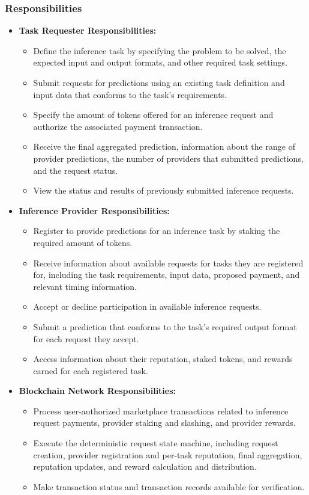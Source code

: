 \documentclass[12pt]{article}
\begin{document}
\subsubsection{Responsibilities}
\begin{itemize}

\item \textbf{Task Requester Responsibilities:}
\begin{itemize}
    \item Define the inference task by specifying the problem to be solved, the expected input and output formats, and other required task settings.
    \item Submit requests for predictions using an existing task definition and input data that conforms to the task's requirements.
    \item Specify the amount of tokens offered for an inference request and authorize the associated payment transaction.
    \item Receive the final aggregated prediction, information about the range of provider predictions, the number of providers that submitted predictions, and the request status.
    \item View the status and results of previously submitted inference requests.
\end{itemize}

\item \textbf{Inference Provider Responsibilities:}
\begin{itemize}
    \item Register to provide predictions for an inference task by staking the required amount of tokens.
    \item Receive information about available requests for tasks they are registered for, including the task requirements, input data, proposed payment, and relevant timing information.
    \item Accept or decline participation in available inference requests.
    \item Submit a prediction that conforms to the task's required output format for each request they accept.
    \item Access information about their reputation, staked tokens, and rewards earned for each registered task.
\end{itemize}

\item \textbf{Blockchain Network Responsibilities:}
\begin{itemize}
    \item Process user-authorized marketplace transactions related to inference request
    payments, provider staking and slashing, and provider rewards. 
    \item Execute the deterministic request state machine, including request
    creation, provider registration and per-task reputation, final
    aggregation, reputation updates, and reward calculation and distribution.
    \item Make transaction status and transaction records available for verification.
\end{itemize}


\end{itemize}
\end{document}
